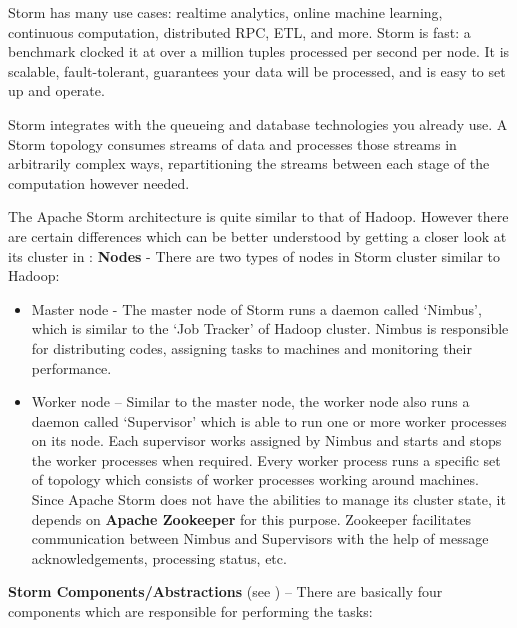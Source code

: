 Storm has many use cases: realtime analytics, online machine learning, continuous computation, distributed RPC, ETL, and more. Storm is fast: a benchmark clocked it at over a million tuples processed per second per node. It is scalable, fault-tolerant, guarantees your data will be processed, and is easy to set up and operate.

Storm integrates with the queueing and database technologies you already use. A Storm topology consumes streams of data and processes those streams in arbitrarily complex ways, repartitioning the streams between each stage of the computation however needed. 

The Apache Storm architecture is quite similar to that of Hadoop. However there are certain differences which can be better understood by getting a closer look at its cluster in : 
\textbf{Nodes} - There are two types of nodes in Storm cluster similar to Hadoop:
\begin{itemize}
	\item {Master node - }The master node of Storm runs a daemon called ‘Nimbus’, which is similar to the ‘Job Tracker’ of Hadoop cluster. Nimbus is responsible for distributing codes, assigning tasks to machines and monitoring their performance.
	\item {Worker node – }Similar to the master node, the worker node also runs a daemon called ‘Supervisor’ which is able to run one or more worker processes on its node. Each supervisor works assigned by Nimbus and starts and stops the worker processes when required. Every worker process runs a specific set of topology which consists of worker processes working around machines. Since Apache Storm does not have the abilities to manage its cluster state, it depends on \textbf{Apache Zookeeper} for this purpose. Zookeeper facilitates communication between Nimbus and Supervisors with the help of message acknowledgements, processing status, etc.
\end{itemize}
\textbf{Storm Components/Abstractions} (see  ) – There are basically four components which are responsible for performing the tasks:


